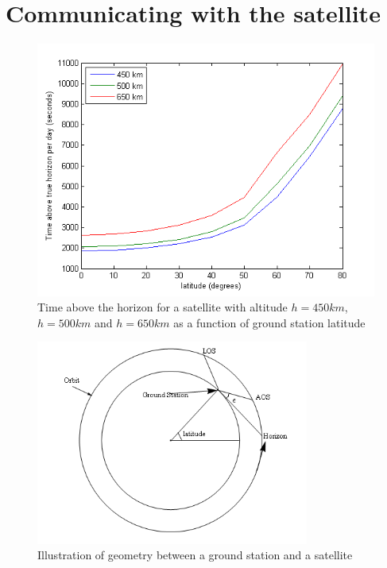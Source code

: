 \section{Communicating with the satellite}

\begin{figure}
  \begin{center}
    \includegraphics[width=1.0\textwidth]{Figures/accesstid450_500_650horizont}
  \end{center}
  \caption[LOS for 450 og 650]{Time above the horizon for a satellite with altitude $h=450km$, $h=500km$ and $h=650km$ as a function of ground station latitude}
  \label{fig:access_horizon}
\end{figure}

\begin{figure}
  \begin{center}
    \includegraphics[trim = 5mm 30mm 5mm 0mm, clip, width=0.8\textwidth]{Figures/groundstation_satellite_geometry}
  \end{center}
  \caption[Ground station satellite geometry]{Illustration of geometry between a ground station and a satellite}
  \label{fig:ground_station_satellite_geometry}
\end{figure}

